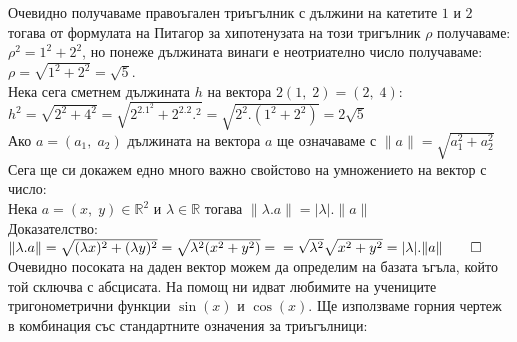 \documentclass[12pt]{article}
\newcommand{\R}{\mathbb{R}}
\begin{document}
Очевидно получаваме правоъгален триъгълник с дължини на катетите $1$ и $2$ тогава от формулата на Питагор
за хипотенузата на този тригълник $\rho$ получаваме: \\
$\rho^2 = 1^2 + 2^2$, но понеже дължината винаги е неотриателно число получаваме: \\
$\rho = \sqrt{1^2 + 2^2} = \sqrt{5}$. \\

Нека сега сметнем дължината $h$ на вектора $2(1, \; 2) = (2, \; 4)$: \\
$h^2 = \sqrt{2^2 + 4^2} = \sqrt{2^2.1^2 + 2^2.2.^2} = \sqrt{2^2.(1^2 + 2^2)} = 2\sqrt{5}$ \\

Ако $a = (a_1, \; a_2)$ дължината на вектора $a$ ще означаваме с $\|a\| = \sqrt{a_1^2 + a_2^2}$ \\

Сега ще си докажем едно много важно свойстово на умножението на вектор с число: \\

Нека $a = (x, \; y) \in \R^2$ и $\lambda \in \R$ тогава $\|\lambda . a\| = |\lambda|.\|a\|$ \\

Доказателство: $\|\lambda . a\| = \sqrt{(\lambda x)^2 + (\lambda y)^2} = \sqrt{\lambda^2(x^2 + y^2)} = \\
= \sqrt{\lambda^2}\sqrt{x^2 + y^2} = |\lambda|.\|a\| \qed$ \\

Очевидно посоката на даден вектор можем да определим на базата ъгъла, който той сключва с абсцисата.
На помощ ни идват любимите на учениците тригонометрични функции $\sin(x)$ и $\cos(x)$.
Ще използваме горния чертеж в комбинация със стандартните означения за триъгълници: \\

 \\\\
\end{document}
